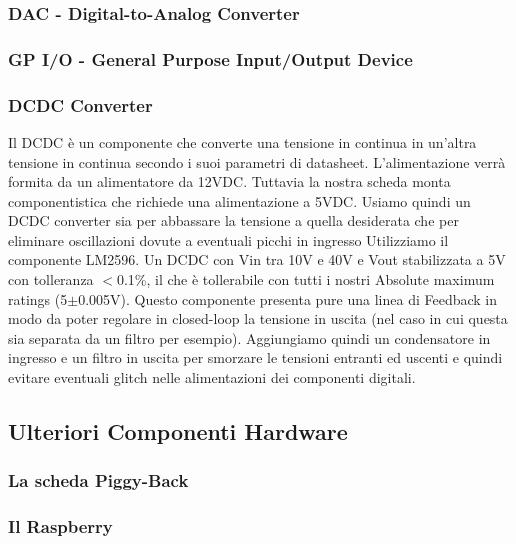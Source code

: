 \documentclass[10pt]{article}
\begin{document}
		\subsubsection{DAC - Digital-to-Analog Converter}\label{sec:dac}

		\subsubsection{GP I/O - General Purpose Input/Output Device}\label{sec:gpio}

		\subsubsection{DCDC Converter}\label{sec:dcdc}
		Il DCDC è un componente che converte una tensione in continua in un'altra tensione in continua secondo i suoi parametri di datasheet.
		L'alimentazione verrà formita da un alimentatore da 12VDC. Tuttavia la nostra scheda monta componentistica che richiede una alimentazione a 5VDC. Usiamo quindi un DCDC converter sia per abbassare la tensione a quella desiderata che per eliminare oscillazioni dovute a eventuali picchi in ingresso
		Utilizziamo il componente LM2596. Un DCDC con Vin tra 10V e 40V e Vout stabilizzata a 5V con tolleranza \(<\)0.1\%, il che è tollerabile con tutti i nostri Absolute maximum ratings (5\(\pm\)0.005V).
		Questo componente presenta pure una linea di Feedback in modo da poter regolare in closed-loop la tensione in uscita (nel caso in cui questa sia separata da un filtro per esempio).
		Aggiungiamo quindi un condensatore in ingresso e un filtro in uscita per smorzare le tensioni entranti ed uscenti e quindi evitare eventuali glitch nelle alimentazioni dei componenti digitali.

	\subsection{Ulteriori Componenti Hardware}
		\subsubsection{La scheda Piggy-Back}\label{sec:piggy}

		\subsubsection{Il Raspberry}\label{sec:rasp}
\end{document}
